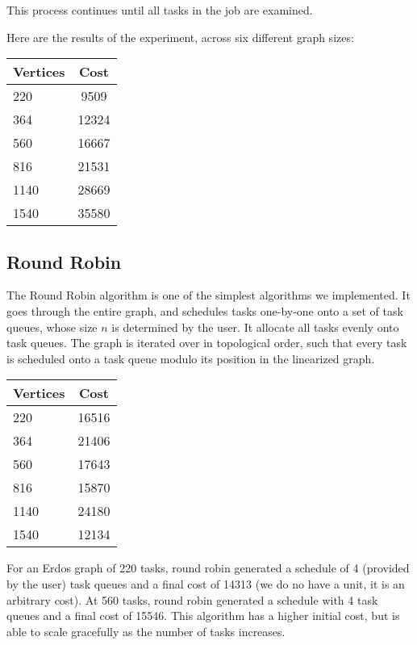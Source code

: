 \documentclass[11pt, oneside]{article}   	%
\begin{document}
This process continues until all tasks in the job are examined.

Here are the results of the experiment, across six different graph sizes:

\begin{center}
\begin{tabular}{| l | c |}
  \hline
  Vertices & Cost \\ \hline
  220 & 9509 \\
  364 & 12324 \\
  560 & 16667 \\
  816 & 21531 \\
  1140 & 28669 \\
  1540 & 35580 \\
  \hline
\end{tabular}
\end{center}

\subsection{Round Robin}

The Round Robin algorithm is one of the simplest algorithms we implemented. It goes through the entire graph, and schedules tasks one-by-one onto a set of task queues, whose size $n$ is determined by the user. It allocate all tasks evenly onto task queues. The graph is iterated over in topological order, such that every task is scheduled onto a task queue modulo its position in the linearized graph.

\begin{center}
\begin{tabular}{| l | c |}
  \hline
  Vertices & Cost \\ \hline
  220 & 16516 \\
  364 & 21406 \\
  560 & 17643 \\
  816 & 15870 \\
  1140 & 24180 \\
  1540 & 12134 \\
  \hline			
\end{tabular}
\end{center}

For an Erdos graph of 220 tasks, round robin generated a schedule of 4 (provided by the user) task queues and a final cost of 14313 (we do no have a unit, it is an arbitrary cost). At 560 tasks, round robin generated a schedule with 4 task queues and a final cost of 15546. This algorithm has a higher initial cost, but is able to scale gracefully as the number of tasks increases.
\end{document}
